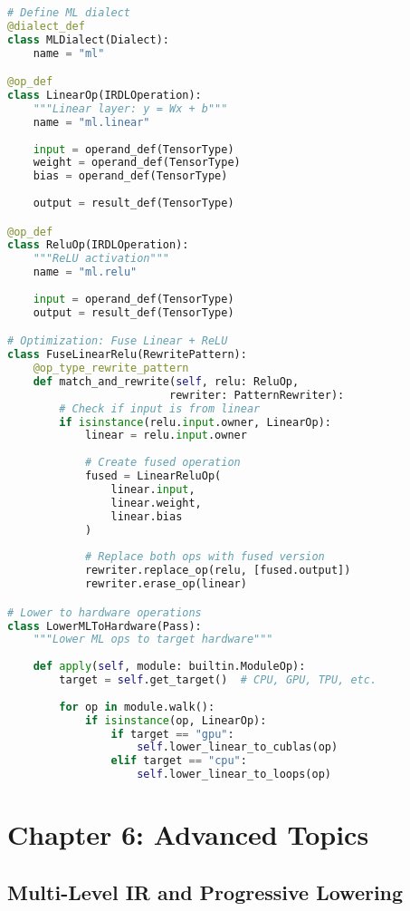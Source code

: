 \documentclass[11pt,a4paper]{article}
\begin{document}
\begin{lstlisting}[language=Python, caption=Mini ML Compiler]
# Define ML dialect
@dialect_def
class MLDialect(Dialect):
    name = "ml"

@op_def
class LinearOp(IRDLOperation):
    """Linear layer: y = Wx + b"""
    name = "ml.linear"
    
    input = operand_def(TensorType)
    weight = operand_def(TensorType)  
    bias = operand_def(TensorType)
    
    output = result_def(TensorType)

@op_def
class ReluOp(IRDLOperation):
    """ReLU activation"""
    name = "ml.relu"
    
    input = operand_def(TensorType)
    output = result_def(TensorType)

# Optimization: Fuse Linear + ReLU
class FuseLinearRelu(RewritePattern):
    @op_type_rewrite_pattern
    def match_and_rewrite(self, relu: ReluOp, 
                         rewriter: PatternRewriter):
        # Check if input is from linear
        if isinstance(relu.input.owner, LinearOp):
            linear = relu.input.owner
            
            # Create fused operation
            fused = LinearReluOp(
                linear.input, 
                linear.weight,
                linear.bias
            )
            
            # Replace both ops with fused version
            rewriter.replace_op(relu, [fused.output])
            rewriter.erase_op(linear)

# Lower to hardware operations
class LowerMLToHardware(Pass):
    """Lower ML ops to target hardware"""
    
    def apply(self, module: builtin.ModuleOp):
        target = self.get_target()  # CPU, GPU, TPU, etc.
        
        for op in module.walk():
            if isinstance(op, LinearOp):
                if target == "gpu":
                    self.lower_linear_to_cublas(op)
                elif target == "cpu":
                    self.lower_linear_to_loops(op)
\end{lstlisting}

\section{Chapter 6: Advanced Topics}

\subsection{Multi-Level IR and Progressive Lowering}
\end{document}
